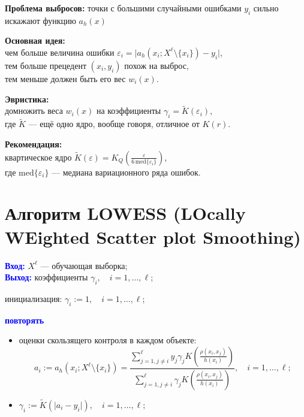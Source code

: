 \textbf{Проблема выбросов:} точки с большими случайными ошибками \(y_i\) сильно искажают функцию \(a_h(x)\)

\vspace{1em}
\textbf{Основная идея:} \\
чем больше величина ошибки \(\varepsilon_i = \lvert a_h(x_i; X^\ell \setminus \{x_i\}) - y_i \rvert\), \\
тем больше прецедент \((x_i, y_i)\) похож на выброс, \\
тем меньше должен быть его вес \(w_i(x)\).

\vspace{1em}
\textbf{Эвристика:} \\
домножить веса \(w_i(x)\) на коэффициенты \(\gamma_i = \tilde{K}(\varepsilon_i)\), \\
где \(\tilde{K}\) — ещё одно ядро, вообще говоря, отличное от \(K(r)\).

\vspace{1em}
\textbf{Рекомендация:} \\
квартическое ядро \(\tilde{K}(\varepsilon) = K_Q \left( \frac{\varepsilon}{6 \, \mathrm{med}\{\varepsilon_i\}} \right)\), \\
где \(\mathrm{med}\{\varepsilon_i\}\) — медиана вариационного ряда ошибок.

\section*{Алгоритм LOWESS (LOcally WEighted Scatter plot Smoothing)}

\vspace{1em}
\textcolor{blue}{\textbf{Вход:}} \(X^\ell\) — обучающая выборка; \\
\textcolor{blue}{\textbf{Выход:}} коэффициенты \(\gamma_i, \quad i = 1, \ldots, \ell\);

\vspace{1em}
инициализация: \(\gamma_i := 1, \quad i = 1, \ldots, \ell\);

\vspace{1em}
\textcolor{blue}{\textbf{повторять}}
\begin{itemize}
    \item оценки скользящего контроля в каждом объекте:
    \[
    a_i := a_h(x_i; X^\ell \setminus \{x_i\}) = \frac{\sum\limits_{j=1, j \neq i}^{\ell} y_j \gamma_j K\left( \frac{\rho(x_i, x_j)}{h(x_i)} \right)}{\sum\limits_{j=1, j \neq i}^{\ell} \gamma_j K\left( \frac{\rho(x_i, x_j)}{h(x_i)} \right)}, \quad i = 1, \ldots, \ell;
    \]
    \item \(\gamma_i := \tilde{K}(\lvert a_i - y_i \rvert), \quad i = 1, \ldots, \ell;\)
\end{itemize}

